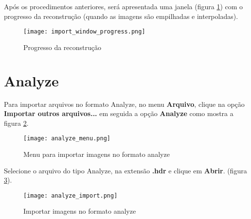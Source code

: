 Após os procedimentos anteriores, será apresentada uma janela (figura \ref{fig:prog_recons}) com o progresso
da reconstrução (quando as imagens são empilhadas e interpoladas).

\begin{figure}[!htb]
\centering
\texttt{[image: import\_window\_progress.png]} 
\caption{Progresso da reconstrução}
\label{fig:prog_recons}
\end{figure}

\newpage

\section{Analyze}

Para importar arquivos no formato Analyze, no menu \textbf{Arquivo}, clique na opção \textbf{Importar outros arquivos...} em seguida a opção \textbf{Analyze} como mostra a figura \ref{fig:analyze_menu}.

\begin{figure}[!htb]
\centering
\texttt{[image: analyze\_menu.png]}
\caption{Menu para importar imagens no formato analyze}
\label{fig:analyze_menu}
\end{figure}

Selecione o arquivo do tipo Analyze, na extensão \textbf{.hdr} e clique em \textbf{Abrir}. (figura \ref{fig:analyze_import}).

\begin{figure}[!htb]
\centering
\texttt{[image: analyze\_import.png]}
\caption{Importar imagens no formato analyze}
\label{fig:analyze_import}
\end{figure}
